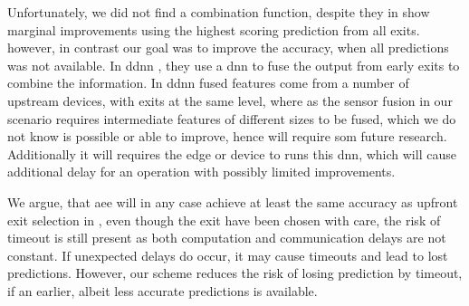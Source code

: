 Unfortunately, we did not find a combination function, despite they in \cite{kaya_shallow-deep_nodate} show marginal improvements using the highest scoring prediction from all exits. however, in contrast our goal was to improve the accuracy, when all predictions was not available. 
In \gls{ddnn} \cite{teerapittayanon_distributed_2017}, they use a \gls{dnn} to fuse the output from early exits to combine the information. In \gls{ddnn} fused features come from a number of upstream devices, with exits at the same level, where as the sensor fusion in our scenario requires intermediate features of different sizes to be fused, which we do not know is possible or able to improve, hence will require som future research. Additionally it will requires the edge or device to runs this \gls{dnn}, which will cause additional delay  for an operation with possibly limited improvements.





We argue, that \gls{aee} will in any case achieve at least the same accuracy as upfront exit selection in \cite{li_edge_2018}, even though the exit have been chosen with care, the risk of timeout is still present as both computation and communication delays are not constant. If unexpected delays do occur, it may cause timeouts and lead to lost predictions. However, our scheme reduces the risk of losing prediction by timeout, if an earlier, albeit less accurate predictions is available. 


   



